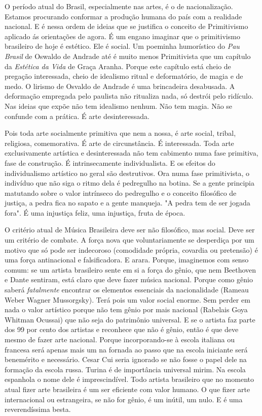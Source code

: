 O período atual do Brasil, especialmente nas artes, é o de
nacionalização. Estamos procurando conformar a produção humana do país
com a realidade nacional. E é nessa ordem de ideias que se justifica o
conceito de Primitivismo aplicado ás orientações de agora. É um engano
imaginar que o primitivismo brasileiro de hoje é estético. Ele é social.
Um poeminha humorístico do \emph{Pau Brasil} de Oswaldo de Andrade até é
muito menos Primitivista que um capítulo da \emph{Estética da Vida} de
Graça Aranha. Porque este capítulo está cheio de pregação interessada,
cheio de idealismo ritual e deformatório, de magia e de medo. O lirismo
de Osvaldo de Andrade é uma brincadeira desabusada. A deformação
empregada pelo paulista não ritualiza nada, só destrói pelo ridículo.
Nas ideias que expõe não tem idealismo nenhum. Não tem magia. Não se
confunde com a prática. É arte desinteressada.

Pois toda arte socialmente primitiva que nem a nossa, é arte social,
tribal, religiosa, comemorativa. É arte de circunstância. É interessada.
Toda arte exclusivamente artística e desinteressada não tem cabimento
numa fase primitiva, fase de construção. É intrinsecamente
individualista. E os efeitos do individualismo artístico no geral são
destrutivos. Ora numa fase primitivista, o indivíduo que não siga o
ritmo dela é pedregulho na botina. Se a gente principia matutando sobre
o valor intrínseco do pedregulho e o conceito filosófico de justiça, a
pedra fica no sapato e a gente manqueja. "A pedra tem de ser jogada
fora". É uma injustiça feliz, uma injustiça, fruta de época.~

O critério atual de Música Brasileira deve ser não filosófico, mas
social. Deve ser um critério de combate. A força nova que
voluntariamente se desperdiça por um motivo que só pode ser indecoroso
(comodidade própria, covardia ou pretensão) é uma força antinacional e
falsificadora. E arara. Porque, imaginemos com senso comum: se um
artista brasileiro sente em si a força do gênio, que nem Beethoven e
Dante sentiram, está claro que deve fazer música nacional. Porque como
gênio saberá \emph{fatalmente} encontrar os elementos essenciais da
nacionalidade (Rameau Weber Wagner Mussorgsky). Terá pois um valor
social enorme. Sem perder em nada o valor artístico porque não tem gênio
por mais nacional (Rabelais Goya Whitman Ocussai) que não seja do
patrimônio universal. E se o artista faz parte dos 99 por cento dos
artistas e reconhece que não é gênio, então é que deve mesmo de fazer
arte nacional. Porque incorporando-se à escola italiana ou francesa será
apenas mais um na fornada ao passo que na escola iniciante será
benemérito e necessário. Cesar Cui seria ignorado se não fosse o papel
dele na formação da escola russa. Turina é de importância universal
mirim. Na escola espanhola o nome dele é imprescindível. Todo artista
brasileiro que no momento atual fizer arte brasileira é um ser eficiente
com valor humano. O que fizer arte internacional ou estrangeira, se não
for gênio, é um inútil, um nulo. E é uma reverendíssima besta.~

